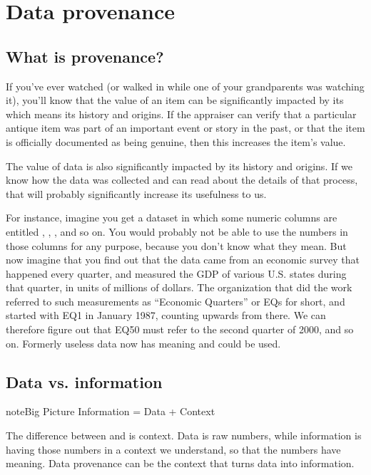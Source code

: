 \documentclass[letterpaper,10pt,english]{jupyterBook}
\begin{document}
\section{Data provenance}
\label{\detokenize{chapter-13-etl:data-provenance}}

\subsection{What is provenance?}
\label{\detokenize{chapter-13-etl:what-is-provenance}}
\sphinxAtStartPar
If you’ve ever watched  (or walked in while one of your grandparents was watching it), you’ll know that the value of an item can be significantly impacted by its  which means its history and origins.  If the appraiser can verify that a particular antique item was part of an important event or story in the past, or that the item is officially documented as being genuine, then this increases the item’s value.

\sphinxAtStartPar
The value of data is also significantly impacted by its history and origins.  If we know how the data was collected and can read about the details of that process, that will probably significantly increase its usefulness to us.

\sphinxAtStartPar
For instance, imagine you get a dataset in which some numeric columns are entitled , , , and so on.  You would probably not be able to use the numbers in those columns for any purpose, because you don’t know what they mean.  But now imagine that you find out that the data came from an economic survey that happened every quarter, and measured the GDP of various U.S. states during that quarter, in units of millions of dollars.  The organization that did the work referred to such measurements as “Economic Quarters” or EQs for short, and started with EQ1 in January 1987, counting upwards from there.  We can therefore figure out that EQ50 must refer to the second quarter of 2000, and so on.  Formerly useless data now has meaning and could be used.


\subsection{Data vs. information}
\label{\detokenize{chapter-13-etl:data-vs-information}}
\begin{sphinxadmonition}{note}{Big Picture \sphinxhyphen{} Information = Data + Context}

\sphinxAtStartPar
The difference between  and  is context.  Data is raw numbers, while information is having those numbers in a context we understand, so that the numbers have meaning.  Data provenance can be the context that turns data into information.
\end{sphinxadmonition}
\end{document}
